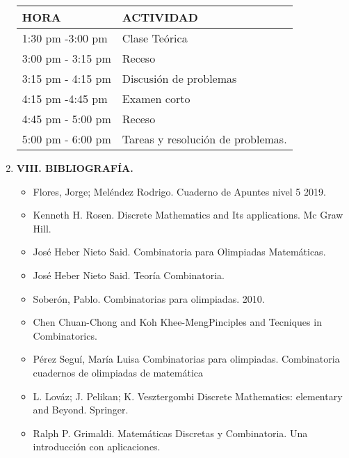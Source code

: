 \begin{enumerate}
\begin{center}
\begin{table}[h!]
    \centering
    \begin{tabular}{ |p{5cm}||p{5cm}| }
\hline
\textbf{HORA} & \textbf{ACTIVIDAD}\\
\hline
1:30 pm -3:00 pm &  Clase Teórica   \\
3:00 pm - 3:15 pm &  Receso   \\
3:15 pm - 4:15 pm    &  Discusión de problemas   \\
4:15 pm -4:45 pm & Examen corto \\
4:45 pm - 5:00 pm &  Receso   \\
5:00 pm - 6:00 pm & Tareas y resolución de problemas.\\
\hline
\end{tabular}
\end{table}

\end{center}
  



\thispagestyle{empty}
\item {\bf\large VIII.  BIBLIOGRAFÍA.}
\begin{itemize}
\item Flores, Jorge; Meléndez Rodrigo. Cuaderno de Apuntes nivel 5 2019.
\item Kenneth H. Rosen. Discrete Mathematics and Its applications. Mc Graw Hill.
\item José Heber Nieto Said. Combinatoria para Olimpiadas Matemáticas.
\item José Heber Nieto Said. Teoría Combinatoria.
\item Soberón, Pablo. Combinatorias para olimpiadas. 2010.
\item Chen Chuan-Chong and Koh Khee-MengPinciples and Tecniques in Combinatorics.
\item Pérez Seguí, María Luisa Combinatorias para olimpiadas. Combinatoria cuadernos de olimpiadas de matemática
\item L. Lováz; J. Pelikan; K. Vesztergombi Discrete Mathematics: elementary and Beyond.
Springer.
\item Ralph P. Grimaldi. Matemáticas Discretas y Combinatoria. Una introducción con aplicaciones.

\end{itemize}

\end{enumerate}




